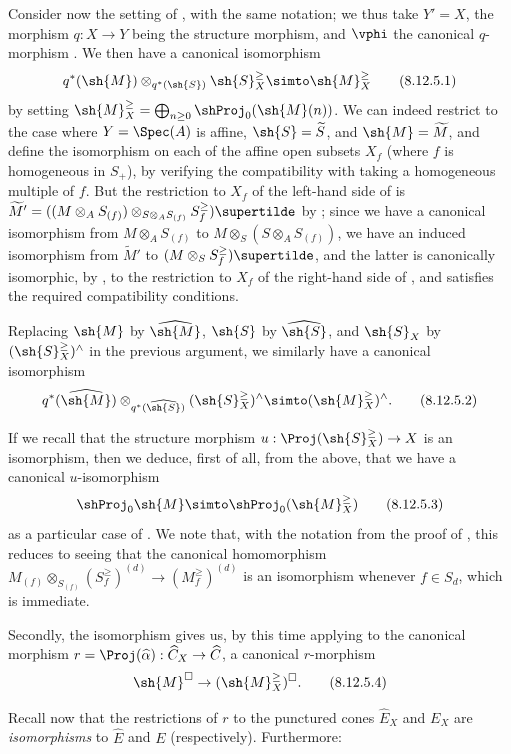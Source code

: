 \begin{env}[8.12.5]
\label{II.8.12.5}
Consider now the setting of , with the same notation;
we thus take $Y'=X$, the morphism $q:X\to Y$ being the structure morphism, and $\vphi$ the canonical $q$-morphism .
We then have a canonical isomorphism
\[
\label{II.8.12.5.1}
    q^*(\sh{M})\otimes_{q^*(\sh{S})}\sh{S}_X^\geq \simto \sh{M}_X^\geq
\tag{8.12.5.1}
\]
by setting $\sh{M}_X^\geq=\bigoplus_{n\geq0}\shProj_0(\sh{M}(n))$.
We can indeed restrict to the case where $Y=\Spec(A)$ is affine, $\sh{S}=\widetilde{S}$, and $\sh{M}=\widetilde{M}$, and define the isomorphism  on each of the affine open subsets $X_f$ (where $f$ is homogeneous in $S_+$), by verifying the compatibility with taking a homogeneous multiple of $f$.
But the restriction to $X_f$ of the left-hand side of  is $\widetilde{M}'=((M\otimes_A S_{(f)})\otimes_{S\otimes_A S_{(f)}}S_f^\geq)\supertilde$ by ;
since we have a canonical isomorphism from $M\otimes_A S_{(f)}$ to $M\otimes_S(S\otimes_A S_{(f)})$, we have an induced isomorphism from $\widetilde{M}'$ to $(M\otimes_S S_f^\geq)\supertilde$, and the latter is canonically isomorphic, by , to the restriction to $X_f$ of the right-hand side of , and satisfies the required compatibility conditions.

Replacing $\sh{M}$ by $\widehat{\sh{M}}$, $\sh{S}$ by $\widehat{\sh{S}}$, and $\sh{S}_X$ by $(\sh{S}_X^\geq)^\wedge$ in the previous argument, we similarly have a canonical isomorphism
\[
\label{II.8.12.5.2}
    q^*(\widehat{\sh{M}})\otimes_{q^*(\widehat{\sh{S}})}(\sh{S}_X^\geq)^\wedge \simto (\sh{M}_X^\geq)^\wedge.
\tag{8.12.5.2}
\]

If we recall  that the structure morphism $u:\Proj(\sh{S}_X^\geq)\to X$ is an isomorphism, then we deduce, first of all, from the above, that we have a canonical $u$-isomorphism
\[
\label{II.8.12.5.3}
    \shProj_0\sh{M} \simto \shProj_0(\sh{M}_X^\geq)
\tag{8.12.5.3}
\]
as a particular case of .
We note that, with the notation from the proof of , this reduces to seeing that the canonical homomorphism $M_{(f)}\otimes_{S_{(f)}}(S_f^\geq)^{(d)}\to(M_f^\geq)^{(d)}$ is an isomorphism whenever $f\in S_d$, which is immediate.

Secondly, the isomorphism  gives us, by this time applying  to the canonical morphism $r=\Proj(\widehat{\alpha}):\widehat{C}_X\to\widehat{C}$, a canonical $r$-morphism
\[
\label{II.8.12.5.4}
    \sh{M}^\square \to (\sh{M}_X^\geq)^\square.
\tag{8.12.5.4}
\]

Recall now  that the restrictions of $r$ to the punctured cones $\widehat{E}_X$ and $E_X$ are \emph{isomorphisms} to $\widehat{E}$ and $E$ (respectively).
Furthermore:
\end{env}

